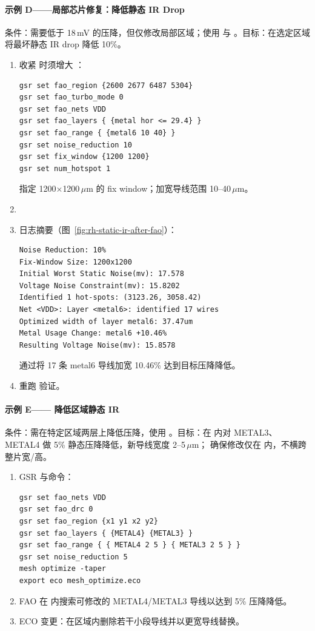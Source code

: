 \paragraph{示例 D——局部芯片修复：降低静态 IR Drop}
条件：需要低于 18\,mV 的压降，但仅修改局部区域；使用  与 。目标：在选定区域将最坏静态 IR drop 降低 10\%。
\begin{enumerate}
  \item 收紧  时须增大 ：
\begin{lstlisting}
gsr set fao_region {2600 2677 6487 5304}
gsr set fao_turbo_mode 0
gsr set fao_nets VDD
gsr set fao_layers { {metal hor <= 29.4} }
gsr set fao_range { {metal6 10 40} }
gsr set noise_reduction 10
gsr set fix_window {1200 1200}
gsr set num_hotspot 1
\end{lstlisting}
  指定 1200$\times$1200\,$\mu$m 的 fix window；加宽导线范围 10--40\,$\mu$m。
  \item {}
  \item 日志摘要（图~\ref{fig:rh-static-ir-after-fao}）：
\begin{lstlisting}
Noise Reduction: 10%
Fix-Window Size: 1200x1200
Initial Worst Static Noise(mv): 17.578
Voltage Noise Constraint(mv): 15.8202
Identified 1 hot-spots: (3123.26, 3058.42)
Net <VDD>: Layer <metal6>: identified 17 wires
Optimized width of layer metal6: 37.47um
Metal Usage Change: metal6 +10.46%
Resulting Voltage Noise(mv): 15.8578
\end{lstlisting}
  通过将 17 条 metal6 导线加宽 10.46\% 达到目标压降降低。
  \item 重跑  验证。
\end{enumerate}

\label{fig:rh-static-ir-after-fao}

\paragraph{示例 E—— 降低区域静态 IR}
条件：需在特定区域两层上降低压降，使用 。目标：在  内对 METAL3、METAL4 做 5\% 静态压降降低，新导线宽度 2--5\,$\mu$m； 确保修改仅在  内，不横跨整片宽/高。
\begin{enumerate}
  \item GSR 与命令：
\begin{lstlisting}
gsr set fao_nets VDD
gsr set fao_drc 0
gsr set fao_region {x1 y1 x2 y2}
gsr set fao_layers { {METAL4} {METAL3} }
gsr set fao_range { { METAL4 2 5 } { METAL3 2 5 } }
gsr set noise_reduction 5
mesh optimize -taper
export eco mesh_optimize.eco
\end{lstlisting}
  \item FAO 在  内搜索可修改的 METAL4/METAL3 导线以达到 5\% 压降降低。
  \item ECO 变更：在区域内删除若干小段导线并以更宽导线替换。
\end{enumerate}

